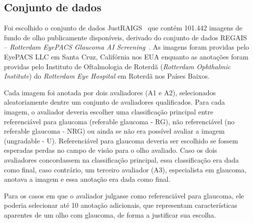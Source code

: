 \documentclass[12pt]{article}
\begin{document}
\subsection{Conjunto de dados}
\label{sec:dataset}

Foi escolhido o conjunto de dados JustRAIGS~\cite{justraigs} que contém 101.442 imagens de fundo de olho publicamente disponíveis, derivado do conjunto de dados REGAIS – \emph{Rotterdam EyePACS Glaucoma AI Screening}~\cite{justraigs_article}. As imagens foram providas pelo EyePACS LLC em Santa Cruz, Califórnia nos EUA enquanto as anotações foram providas pelo Instituto de Oftalmologia de Roterdã (\emph{Rotterdam Ophthalmic Institute}) do \emph{Rotterdam Eye Hospital} em Roterdã nos Países Baixos.

Cada imagem foi anotada por dois avaliadores (A1 e A2), selecionados aleatoriamente dentre um conjunto de avaliadores qualificados.
Para cada imagem, o avaliador deveria escolher uma classificação principal entre referenciável para glaucoma (referable glaucoma - RG), não referenciável (no referable glaucoma - NRG) ou ainda se não era possível avaliar a imagem (ungradable - U). Referenciável para glaucoma deveria ser escolhido se fossem esperadas perdas no campo de visão para o olho avaliado.
Caso os dois avaliadores concordassem na classificação principal, essa classificação era dada como final, caso contrário, um terceiro avaliador (A3), especialista em glaucoma, anotava a imagem e essa anotação era dada como final. \cite{justraigs_article}

Para os casos em que o avaliador julgasse como referenciável para glaucoma, ele poderia selecionar até 10 anotação adicionais, que representam características aparentes de um olho com glaucoma, de forma a justificar sua escolha. \cite{justraigs_article}
\end{document}
